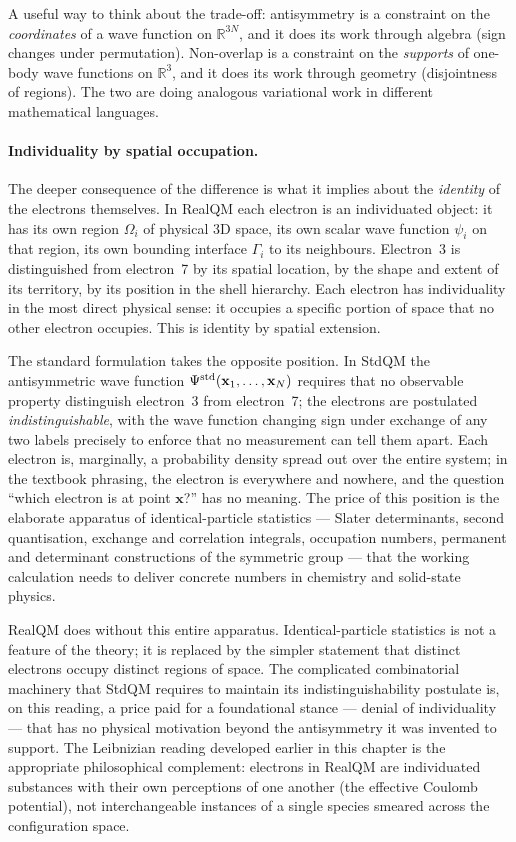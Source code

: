 A useful way to think about the trade-off: antisymmetry is a constraint on the \emph{coordinates} of a wave function on $\mathbb{R}^{3N}$, and it does its work through algebra (sign changes under permutation). Non-overlap is a constraint on the \emph{supports} of one-body wave functions on $\mathbb{R}^3$, and it does its work through geometry (disjointness of regions). The two are doing analogous variational work in different mathematical languages.

\paragraph{Individuality by spatial occupation.}
The deeper consequence of the difference is what it implies about the \emph{identity} of the electrons themselves. In RealQM each electron is an individuated object: it has its own region $\Omega_i$ of physical 3D space, its own scalar wave function $\psi_i$ on that region, its own bounding interface $\Gamma_i$ to its neighbours. Electron~3 is distinguished from electron~7 by its spatial location, by the shape and extent of its territory, by its position in the shell hierarchy. Each electron has individuality in the most direct physical sense: it occupies a specific portion of space that no other electron occupies. This is identity by spatial extension.

The standard formulation takes the opposite position. In StdQM the antisymmetric wave function $\Psi^{\rm std}(\mathbf{x}_1, \ldots, \mathbf{x}_N)$ requires that no observable property distinguish electron~3 from electron~7; the electrons are postulated \emph{indistinguishable}, with the wave function changing sign under exchange of any two labels precisely to enforce that no measurement can tell them apart. Each electron is, marginally, a probability density spread out over the entire system; in the textbook phrasing, the electron is everywhere and nowhere, and the question ``which electron is at point $\mathbf{x}$?'' has no meaning. The price of this position is the elaborate apparatus of identical-particle statistics --- Slater determinants, second quantisation, exchange and correlation integrals, occupation numbers, permanent and determinant constructions of the symmetric group --- that the working calculation needs to deliver concrete numbers in chemistry and solid-state physics.

RealQM does without this entire apparatus. Identical-particle statistics is not a feature of the theory; it is replaced by the simpler statement that distinct electrons occupy distinct regions of space. The complicated combinatorial machinery that StdQM requires to maintain its indistinguishability postulate is, on this reading, a price paid for a foundational stance --- denial of individuality --- that has no physical motivation beyond the antisymmetry it was invented to support. The Leibnizian reading developed earlier in this chapter is the appropriate philosophical complement: electrons in RealQM are individuated substances with their own perceptions of one another (the effective Coulomb potential), not interchangeable instances of a single species smeared across the configuration space.

